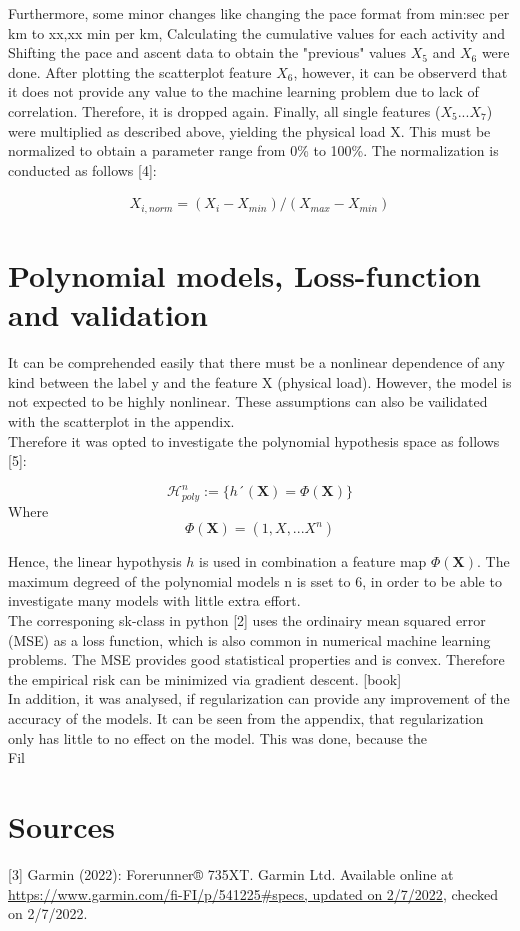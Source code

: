 \documentclass[11pt]{article}
\begin{document}
Furthermore, some minor changes like changing the pace format from min:sec per km to xx,xx min per km, Calculating the cumulative values for each activity and Shifting the pace and ascent data to obtain the "previous" values $X_5$ and $X_6$ were done.
After plotting the scatterplot feature  $X_6$, however, it can be observerd that it does not provide any value  to the machine learning problem due to lack of correlation. Therefore, it is dropped again.
Finally, all single features ($X_5 ... X_7$) were multiplied as described above, yielding the physical load X. This must be normalized to obtain a parameter range from 0\% to 100\%.
The normalization is conducted as follows [4]:

 \begin{align}
	 X_{i,norm} = (X_i-X_{min})/(X_{max}-X_{min})
\end{align}

\section{Polynomial models, Loss-function and validation}
It can be comprehended easily that there must be a nonlinear dependence of any kind between the label y and the feature X (physical load). However, the model is not expected to be highly nonlinear. These assumptions can also be vailidated with the scatterplot in the appendix.\\
Therefore it was opted to investigate the polynomial hypothesis space as follows [5]:

 \begin{equation}
	 \mathcal{H}_{poly}^n := \{h´(\textbf{X}) = \Phi(\textbf{X})\}
\end{equation}
Where
\begin{equation}
	 \Phi(\textbf{X}) = (1,X,...X^n)
\end{equation}

Hence, the linear hypothysis $h$ is used in combination a feature map $\Phi(\textbf{X})$. The maximum degreed of the polynomial models n is sset to 6, in order to be able to investigate many models with little extra effort.\\
The corresponing sk-class in python [2] uses  the ordinairy mean squared error (MSE) as a loss function, which is also common in numerical machine learning problems. The MSE provides good statistical properties and is convex. Therefore the empirical risk can be minimized via gradient descent. [book] \\
In addition, it was analysed, if regularization can provide any improvement of the accuracy of the models. It can be seen from the appendix, that regularization only has little to no effect on the model. This was done, because the \\
Fil



\section{Sources}


[3]	Garmin (2022): Forerunner® 735XT. Garmin Ltd. Available online at    			\url{https://www.garmin.com/fi-FI/p/541225#specs, updated on 2/7/2022}, checked on 2/7/2022.
\end{document}
